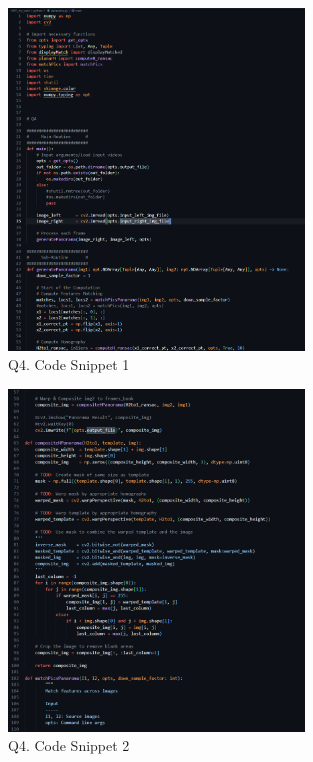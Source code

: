 \documentclass{article}
\begin{document}
	\begin{figure}[H]
		\centering
		\includegraphics[width=0.7\textwidth]{./Q4_pano_cns1.png}  %
		\caption{Q4. Code Snippet 1}
		\label{fig:Q4_cns1}
	\end{figure}
	\begin{figure}[H]
		\centering
		\includegraphics[width=0.7\textwidth]{./Q4_pano_cns2.png}  %
		\caption{Q4. Code Snippet 2}
		\label{fig:Q4_cns2}
	\end{figure}	
\end{document}
